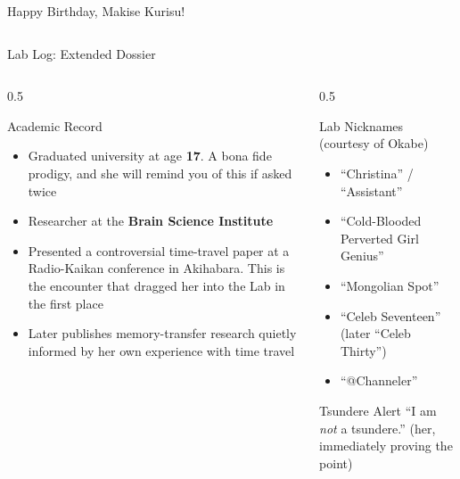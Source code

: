 \documentclass[aspectratio=169, 11pt]{beamer}
\newcommand{\quoteattrib}[1]{{\small\color{LabDeepBlue!80} (#1)}}
\begin{document}
\begin{frame}{Happy Birthday, Makise Kurisu!}
\begin{columns}[c]
    \end{columns}
\end{frame}

\begin{frame}{Lab Log: Extended Dossier}
    \begin{columns}[t]
        \begin{column}{0.5\textwidth}
            \begin{block}{Academic Record}
                \begin{itemize}
                    \item Graduated university at age \textbf{17}. A bona fide prodigy, and she will remind you of this if asked twice
                    \item Researcher at the \textbf{Brain Science Institute}
                    \item Presented a controversial time-travel paper at a Radio-Kaikan conference in Akihabara. This is the encounter that dragged her into the Lab in the first place
                    \item Later publishes memory-transfer research quietly informed by her own experience with time travel
                \end{itemize}
            \end{block}
        \end{column}
        \begin{column}{0.5\textwidth}
            \begin{block}{Lab Nicknames (courtesy of Okabe)}
                \begin{itemize}
                    \small
                    \item ``Christina'' / ``Assistant''
                    \item ``Cold-Blooded Perverted Girl Genius''
                    \item ``Mongolian Spot''
                    \item ``Celeb Seventeen'' (later ``Celeb Thirty'')
                    \item ``@Channeler''
                \end{itemize}
            \end{block}
            \vspace{0.3cm}
            \begin{alertblock}{Tsundere Alert}
                \small ``I am \emph{not} a tsundere.'' \quoteattrib{her, immediately proving the point}
            \end{alertblock}
        \end{column}
    \end{columns}
\end{frame}
\end{document}
